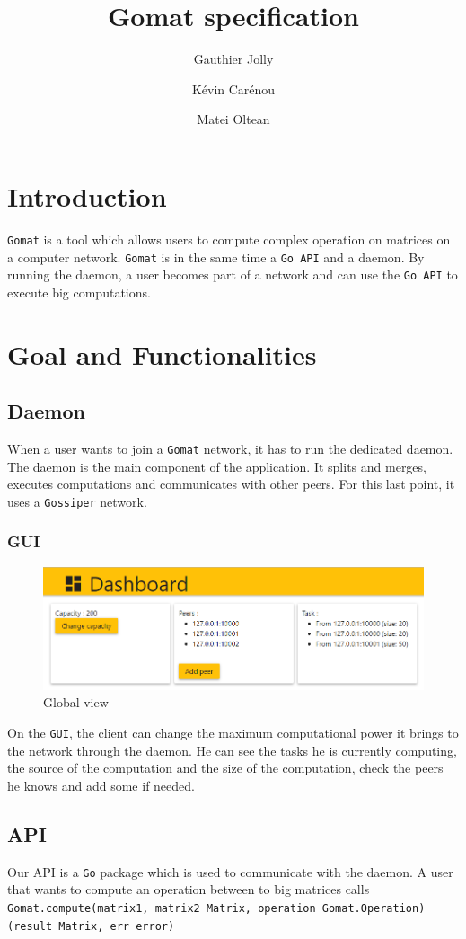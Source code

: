 \documentclass[a4paper,12pt]{article}
\title{Gomat specification}
\author{Gauthier Jolly \and K\'{e}vin Car\'{e}nou \and Matei Oltean}
\newcommand{\Gossiper}{\texttt{Gossiper}\xspace}
\newcommand{\Gomat}{\texttt{Gomat}\xspace}
\newcommand{\Go}{\texttt{Go}\xspace}
\begin{document}
\maketitle
\tableofcontents
\newpage
    \section{Introduction}
    \Gomat is a tool which allows users to compute complex operation on matrices on a computer network.
    \Gomat is in the same time a \texttt{Go API} and a daemon. By running the daemon, a user becomes part of a network and can use the \texttt{Go API} to execute big computations.

    \section{Goal and Functionalities}
        \subsection{Daemon}
    When a user wants to join a \Gomat network, it has to run the dedicated daemon. The daemon is the main component of the application. It splits and merges, executes computations and communicates with other peers. For this last point, it uses a \Gossiper network.

        \subsubsection{GUI}
        \begin{figure}[!ht]
            \includegraphics[width=.95\textwidth]{gui.png}
            \caption{Global view}
            \label{glbView}
        \end{figure}
    On the \texttt{GUI}, the client can change the maximum computational power it brings to the network through the daemon. He can see the tasks he is currently computing, the source of the computation and the size of the computation, check the peers he knows and add some if needed.

        \subsection{API}
        Our API is a \Go package which is used to communicate with the daemon. A user that wants to compute an operation between to big matrices calls\\
    \texttt{Gomat.compute(matrix1, matrix2 Matrix, operation Gomat.Operation) (result Matrix, err error)}
\end{document}
